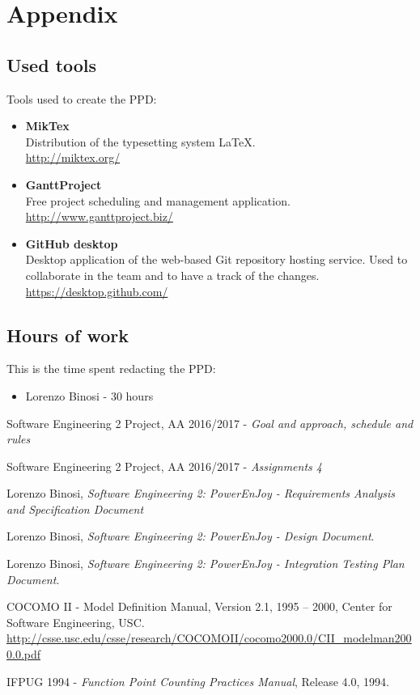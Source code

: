 \appendix \label{sec appendix}

\section{Appendix} 

\subsection {Used tools}
Tools used to create the PPD:
\begin{itemize}
	\item \textbf{MikTex} \\ Distribution of the typesetting system LaTeX. \\ \url{http://miktex.org/} 
	\item \textbf{GanttProject}\\ Free project scheduling and management application. \\ \url{http://www.ganttproject.biz/} 
	\item \textbf{GitHub desktop}\\ Desktop application of the web-based Git repository hosting service. Used to collaborate in the team and to have a track of the changes.  \\ \url{https://desktop.github.com/} 
\end{itemize}

\subsection{Hours of work}
This is the time spent redacting the PPD:
\begin{itemize}
	\item {Lorenzo Binosi} - 30 hours
\end{itemize}

\begin{thebibliography}{1}	
	Software Engineering 2 Project, AA 2016/2017 - \emph{Goal and approach, schedule and rules}
	
	Software Engineering 2 Project, AA 2016/2017 - \emph{Assignments 4}
	
	Lorenzo Binosi, \emph{Software Engineering 2: PowerEnJoy - Requirements Analysis and Specification Document}
	
	Lorenzo Binosi, \emph{Software Engineering 2: PowerEnJoy - Design Document}.

	Lorenzo Binosi, \emph{Software Engineering 2: PowerEnJoy - Integration Testing Plan Document}.

	COCOMO II - Model Definition Manual, Version 2.1, 1995 – 2000, Center for Software Engineering, USC. \\
	\url{http://csse.usc.edu/csse/research/COCOMOII/cocomo2000.0/CII_modelman2000.0.pdf}

	IFPUG 1994 - \emph{Function Point Counting Practices Manual}, Release 4.0, 1994.
\end{thebibliography}
